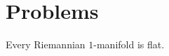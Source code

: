\section{Problems}

\begin{exercise}\label{prob:riemannian-1-manifold-flat}
Every Riemannian $1$-manifold is flat.
\end{exercise}

